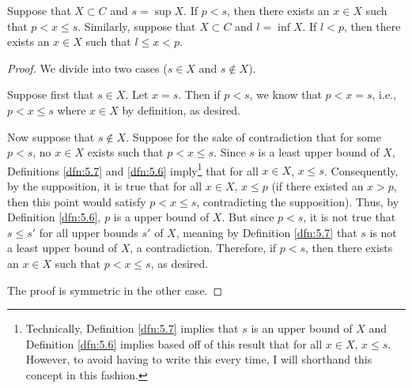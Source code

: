 \documentclass[../main.tex]{subfiles}
\begin{document}
\begin{lemma}\label{lem:5.11}
    Suppose that $X\subset C$ and $s=\sup X$. If $p<s$, then there exists an $x\in X$ such that $p<x\leq s$. Similarly, suppose that $X\subset C$ and $l=\inf X$. If $l<p$, then there exists an $x\in X$ such that $l\leq x<p$.
    \begin{proof}
        We divide into two cases ($s\in X$ and $s\notin X$).\par
        Suppose first that $s\in X$. Let $x=s$. Then if $p<s$, we know that $p<x=s$, i.e., $p<x\leq s$ where $x\in X$ by definition, as desired.\par
        Now suppose that $s\notin X$. Suppose for the sake of contradiction that for some $p<s$, no $x\in X$ exists such that $p<x\leq s$. Since $s$ is a least upper bound of $X$, Definitions \ref{dfn:5.7} and \ref{dfn:5.6} imply\footnote{Technically, Definition \ref{dfn:5.7} implies that $s$ is an upper bound of $X$ and Definition \ref{dfn:5.6} implies based off of this result that for all $x\in X$, $x\leq s$. However, to avoid having to write this every time, I will shorthand this concept in this fashion.} that for all $x\in X$, $x\leq s$. Consequently, by the supposition, it is true that for all $x\in X$, $x\leq p$ (if there existed an $x>p$, then this point would satisfy $p<x\leq s$, contradicting the supposition). Thus, by Definition \ref{dfn:5.6}, $p$ is a upper bound of $X$. But since $p<s$, it is not true that $s\leq s'$ for all upper bounds $s'$ of $X$, meaning by Definition \ref{dfn:5.7} that $s$ is not a least upper bound of $X$, a contradiction. Therefore, if $p<s$, then there exists an $x\in X$ such that $p<x\leq s$, as desired.\par\smallskip
        The proof is symmetric in the other case.
    \end{proof}
\end{lemma}
\end{document}
